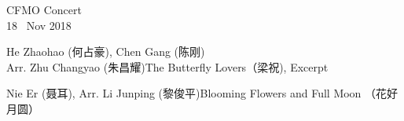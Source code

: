 \documentclass[letter,6pt,poets]{ConcProg}
\begin{document}
\begin{programme}{
    CFMO Concert
\\  {\normalsize 18 ~Nov 2018}
}
  \begin{part}[]
    \begin{composition}{He Zhaohao (何占豪), Chen Gang (陈刚) \\Arr. Zhu Changyao (朱昌耀)}{}{The Butterfly Lovers（梁祝), Excerpt}{}
    \end{composition}
    
    \begin{composition}{Nie Er (聂耳), Arr. Li Junping (黎俊平)}{}{Blooming Flowers and Full Moon （花好月圆）}{}      
    \end{composition}
    

\end{part}
\end{programme}
\end{document}

